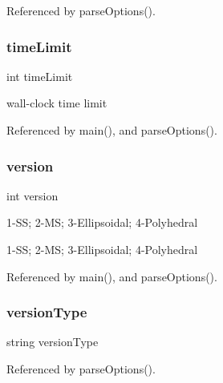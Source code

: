Referenced by parse\+Options().

\mbox{\label{options_8cpp_a4c4841c2a2303b528024625ed83c3b4f}} 
\subsubsection{time\+Limit}
{\footnotesize\ttfamily int time\+Limit}



wall-\/clock time limit 



Referenced by main(), and parse\+Options().

\mbox{\label{options_8cpp_aad880fc4455c253781e8968f2239d56f}} 
\subsubsection{version}
{\footnotesize\ttfamily int version}



1-\/\+SS; 2-\/\+MS; 3-\/\+Ellipsoidal; 4-\/\+Polyhedral 

1-\/\+SS; 2-\/\+MS; 3-\/\+Ellipsoidal; 4-\/\+Polyhedral 

Referenced by main(), and parse\+Options().

\mbox{\label{options_8cpp_a5623197573ddafe3e66247fc9eda58ac}} 
\subsubsection{version\+Type}
{\footnotesize\ttfamily string version\+Type}



Referenced by parse\+Options().

